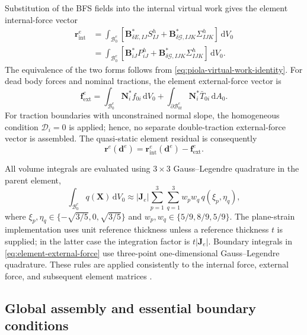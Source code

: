 \documentclass[preprint,12pt]{elsarticle}
\begin{document}
Substitution of the BFS fields into the internal virtual work gives the
element internal-force vector
\begin{align}
 \mathbf{r}_{\mathrm{int}}^e
 &=\int_{\mathcal{B}_0^e}
 \left[
 \mathbf{B}_{\delta E,IJ}^{*}S_{IJ}^h
 +\mathbf{B}_{\delta\mathcal{G},IJK}^{*}\Sigma_{IJK}^h
 \right]\,\mathrm{d}V_0
 \nonumber\\
 &=\int_{\mathcal{B}_0^e}
 \left[
 \mathbf{B}_{iJ}^{*}P_{iJ}^h
 +\mathbf{B}_{\delta\mathcal{G},IJK}^{*}\Sigma_{IJK}^h
 \right]\,\mathrm{d}V_0.
 \label{eq:element-internal-force}
\end{align}
The equivalence of the two forms follows from
\eqref{eq:piola-virtual-work-identity}. For dead body forces and nominal
tractions, the element external-force vector is
\begin{equation}
 \mathbf{f}_{\mathrm{ext}}^e
 =\int_{\mathcal{B}_0^e}\mathbf{N}_i^{*} f_{0i}\,\mathrm{d}V_0
 +\int_{\partial\mathcal{B}_{0t}^e}
 \mathbf{N}_i^{*}\bar{T}_{0i}\,\mathrm{d}A_0.
 \label{eq:element-external-force}
\end{equation}
For traction boundaries with unconstrained normal slope, the homogeneous
condition $\mathcal{D}_i=0$ is applied; hence, no separate double-traction
external-force vector is assembled. The quasi-static element residual is
consequently
\begin{equation}
 \mathbf{r}^e(\mathbf{d}^e)
 =\mathbf{r}_{\mathrm{int}}^e(\mathbf{d}^e)
 -\mathbf{f}_{\mathrm{ext}}^e.
 \label{eq:element-residual}
\end{equation}

All volume integrals are evaluated using $3\times3$ Gauss--Legendre
quadrature in the parent element,
\begin{equation}
 \int_{\mathcal{B}_0^e}q(\mathbf{X})\,\mathrm{d}V_0
 \approx\left|\mathbf{J}_e\right|
 \sum_{p=1}^{3}\sum_{q=1}^{3}
w_pw_q\,q(\xi_p,\eta_q),
 \label{eq:volume-quadrature}
\end{equation}
where $\xi_p,\eta_q\in\{-\sqrt{3/5},0,\sqrt{3/5}\}$ and
$w_p,w_q\in\{5/9,8/9,5/9\}$. The plane-strain implementation uses unit
reference thickness unless a reference thickness $t$ is supplied; in the
latter case the integration factor is $t\left|\mathbf{J}_e\right|$.
Boundary integrals in \eqref{eq:element-external-force} use three-point
one-dimensional Gauss--Legendre quadrature. These rules are applied consistently to the
internal force, external force, and subsequent element matrices
\cite{Hughes1987,Bathe2006}.

\subsection{Global assembly and essential boundary conditions}
\label{sec:global-assembly-essential-bc}
\end{document}
